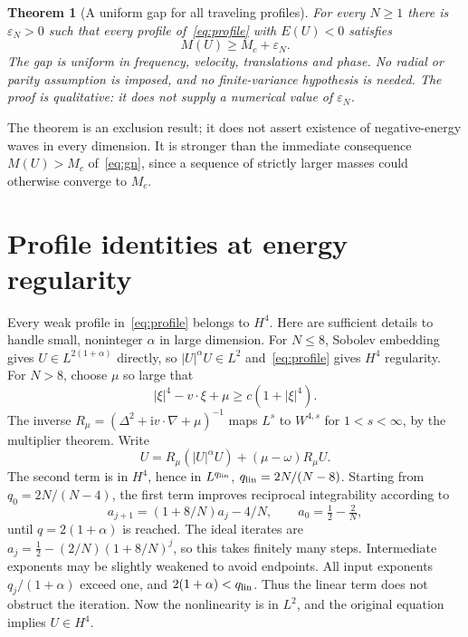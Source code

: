 \documentclass[11pt,a4paper]{article}
\newtheorem{theorem}{Theorem}[section]
\theoremstyle{remark}\newtheorem{remark}[theorem]{Remark}
\newcommand{\ii}{\mathrm i}\newcommand{\dd}{\,\mathrm d}
\begin{document}
\begin{theorem}[A uniform gap for all traveling profiles]\label{thm:gap}
For every $N\ge1$ there is $\varepsilon_N>0$ such that every profile of~\eqref{eq:profile} with $E(U)<0$ satisfies
\[
 \boxed{M(U)\ge M_c+\varepsilon_N.}
\]
The gap is uniform in frequency, velocity, translations and phase. No radial or parity assumption is imposed, and no finite-variance hypothesis is needed. The proof is qualitative: it does not supply a numerical value of $\varepsilon_N$.
\end{theorem}

The theorem is an exclusion result; it does not assert existence of negative-energy waves in every dimension. It is stronger than the immediate consequence $M(U)>M_c$ of~\eqref{eq:gn}, since a sequence of strictly larger masses could otherwise converge to $M_c$.

\section{Profile identities at energy regularity}
Every weak profile in~\eqref{eq:profile} belongs to $H^4$. Here are sufficient details to handle small, noninteger $\alpha$ in large dimension. For $N\le8$, Sobolev embedding gives $U\in L^{2(1+\alpha)}$ directly, so $|U|^\alpha U\in L^2$ and~\eqref{eq:profile} gives $H^4$ regularity. For $N>8$, choose $\mu$ so large that
\[
 |\xi|^4-v\cdot\xi+\mu\ge c(1+|\xi|^4).
\]
The inverse $R_\mu=(\Delta^2+\ii v\cdot\nabla+\mu)^{-1}$ maps $L^s$ to $W^{4,s}$ for $1<s<\infty$, by the multiplier theorem. Write
\[
 U=R_\mu(|U|^\alpha U)+(\mu-\omega)R_\mu U.
\]
The second term is in $H^4$, hence in $L^{q_{\rm lin}}$, $q_{\rm lin}=2N/(N-8)$. Starting from $q_0=2N/(N-4)$, the first term improves reciprocal integrability according to
\[
 a_{j+1}=(1+8/N)a_j-4/N,\qquad
 a_0=\tfrac12-\tfrac2N,
\]
until $q=2(1+\alpha)$ is reached. The ideal iterates are $a_j=\tfrac12-(2/N)(1+8/N)^j$, so this takes finitely many steps. Intermediate exponents may be slightly weakened to avoid endpoints. All input exponents $q_j/(1+\alpha)$ exceed one, and $2(1+\alpha)<q_{\rm lin}$. Thus the linear term does not obstruct the iteration. Now the nonlinearity is in $L^2$, and the original equation implies $U\in H^4$.
\end{document}
